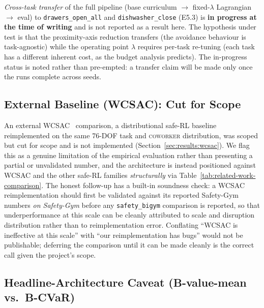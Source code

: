 \documentclass[11pt,a4paper]{report}
\newcommand{\sbigym}{\texttt{safety\_bigym}}
\newcommand{\coworker}{\textsc{coworker}}
\begin{document}
\emph{Cross-task transfer} of the full pipeline (base curriculum
$\rightarrow$ fixed-$\lambda$ Lagrangian $\rightarrow$ eval) to
\texttt{drawers\_open\_all} and \texttt{dishwasher\_close} (E5.3) is
\textbf{in progress at the time of writing} and is not reported as a
result here. The hypothesis under test is that the proximity-axis
reduction transfers (the avoidance behaviour is task-agnostic) while
the operating point $\lambda$ requires per-task re-tuning (each task
has a different inherent cost, as the budget analysis predicts). The
in-progress status is noted rather than pre-empted: a transfer claim
will be made only once the runs complete across seeds.

\subsection{External Baseline (WCSAC): Cut for Scope}
\label{sec:disc:wcsac-honest}

An external WCSAC~\cite{yang2021wcsac} comparison, a distributional
safe-RL baseline reimplemented on the same 76-DOF task and
\coworker{} distribution, was scoped but cut for scope and is not
implemented (Section~\ref{sec:results:wcsac}). We flag this as a
genuine limitation of the empirical evaluation rather than presenting
a partial or unvalidated number, and the architecture is instead
positioned against WCSAC and the other safe-RL families
\emph{structurally} via Table~\ref{tab:related-work-comparison}. The
honest follow-up has a built-in soundness check: a WCSAC
reimplementation should first be validated against its reported
Safety-Gym numbers \emph{on Safety-Gym} before any \sbigym{}
comparison is reported, so that underperformance at this scale can be
cleanly attributed to scale and disruption distribution rather than to
reimplementation error. Conflating ``WCSAC is ineffective at this
scale'' with ``our reimplementation has bugs'' would not be
publishable; deferring the comparison until it can be made cleanly is
the correct call given the project's scope.

\subsection{Headline-Architecture Caveat (B-value-mean vs.\ B-CVaR)}
\label{sec:disc:arch-caveat}
\end{document}
